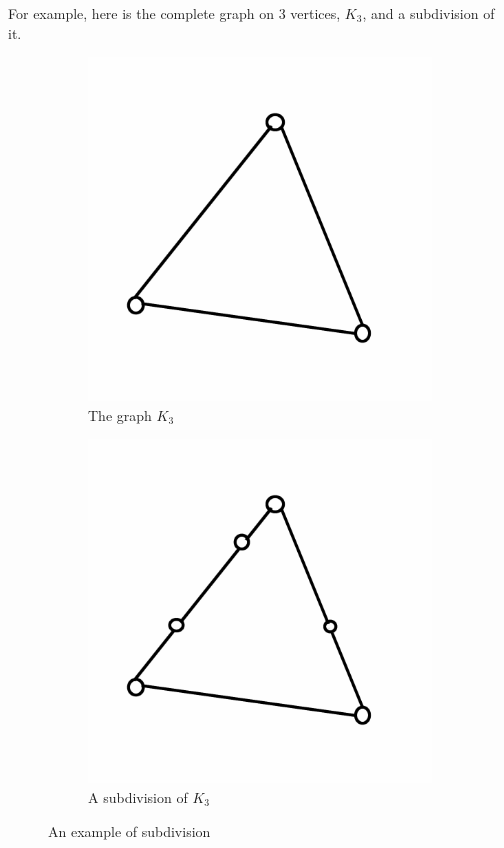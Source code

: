 \documentclass[12pt,letterpaper]{article}
\theoremstyle{definition}
\begin{document}
For example, here is the complete graph on 3 vertices, $K_3$, and a subdivision of it.

\begin{figure}[h]
\centering
\begin{subfigure}[b]{.4\textwidth}
\includegraphics[width=\textwidth]{images/k3.png}
\caption{The graph $K_3$}
\end{subfigure}
\begin{subfigure}[b]{.4\textwidth}
\includegraphics[width=\textwidth]{images/k3subdiv.png}
\caption{A subdivision of $K_3$}
\end{subfigure}
\caption{An example of subdivision}
\end{figure}
\end{document}
